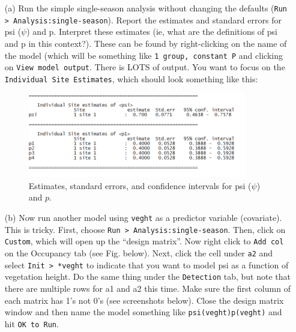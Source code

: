 \documentclass[12pt]{article}\usepackage[]{graphicx}\usepackage[]{color}
\begin{document}
\begin{enumerate}
  \item[(a)] Run the simple single-season analysis without changing the
    defaults (\texttt{Run > Analysis:single-season}). Report the
    estimates and standard errors for psi ($\psi$) and p. Interpret
    these estimates (ie, what are the definitions of psi and p in this
    context?). These can be found by right-clicking on the name of the
    model (which will be something like \texttt{1 group, constant P}
    and clicking on \texttt{View model output}.  There is LOTS of
    output. You want to focus on the \texttt{Individual Site
      Estimates}, which should look something like this: 

\begin{figure}[h!]
  \centering
  \includegraphics[width=0.9\textwidth]{figs/pres-est}
  \caption{\small Estimates, standard errors, and confidence intervals
  for psi ($\psi$) and $p$.}
  \label{fig:pres-est}
\end{figure}
    
  \item[(b)] Now run another model using \texttt{veght} as a
    predictor variable (covariate). This is tricky. First, choose 
    \texttt{Run > Analysis:single-season}. Then, click on
    \texttt{Custom}, which will open up the ``design matrix''. Now
    right click to \texttt{Add col} on the Occupancy tab (see
    Fig. below). Next, click the cell under \texttt{a2} and select 
    \texttt{Init > *veght} to indicate that you want to model psi
    as a function of vegetation height. Do the same thing under the
    \texttt{Detection} tab, but note that there are multiple rows for
    a1 and a2 this time. Make sure the first column of each matrix has
    1's not 0's (see screenshots below). Close the design matrix
    window and then name the model something like 
    \texttt{psi(veght)p(veght)} and hit \texttt{OK to Run}. 


\end{enumerate}
\end{document}
